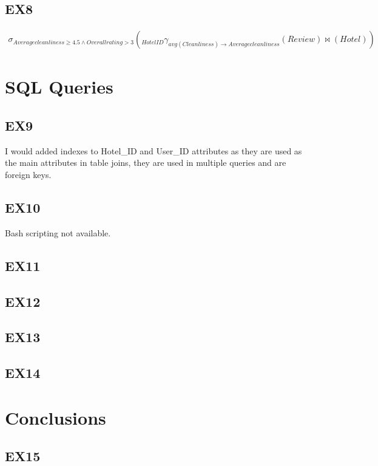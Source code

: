 \documentclass{article}
\begin{document}
	\subsection{EX8}
	\begin{eqnarray}
	\sigma _{Average cleanliness \geq 4.5 \wedge Overall rating > 3}(_{Hotel ID} \gamma _{avg(Cleanliness) \rightarrow Average cleanliness}(Review) \bowtie (Hotel))
	\end{eqnarray}
	
	\section{SQL Queries}
	
	\subsection{EX9}
	I would added indexes to Hotel\_ID and User\_ID attributes as they are used as the main attributes in table joins, they are used in multiple queries and are foreign keys.
	
	\subsection{EX10}
	Bash scripting not available.
	
	\subsection{EX11}
		
	\subsection{EX12}
	
	\subsection{EX13}
	
	\subsection{EX14}
	
	\section{Conclusions}
	
	\subsection{EX15}
\end{document}
